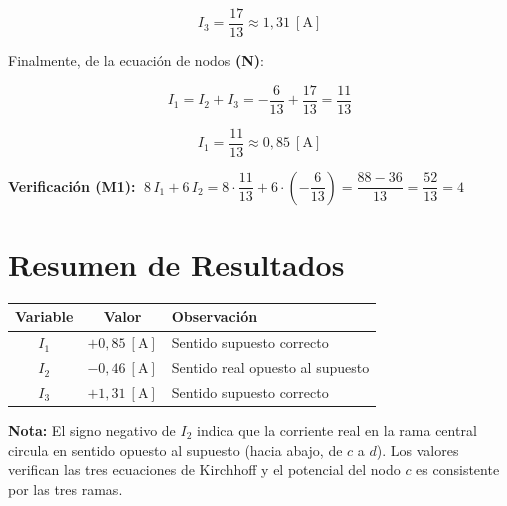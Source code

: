 \documentclass[12pt,letterpaper]{article}
\begin{document}
\[
    \boxed{I_3 = \frac{17}{13} \approx 1{,}31\ [\text{A}]}
\]

Finalmente, de la ecuaci\'on de nodos \textbf{(N)}:

\[
    I_1 = I_2 + I_3 = -\frac{6}{13} + \frac{17}{13} = \frac{11}{13}
\]

\[
    \boxed{I_1 = \frac{11}{13} \approx 0{,}85\ [\text{A}]}
\]

\noindent\textbf{Verificaci\'on (M1):}
$\;8\,I_1 + 6\,I_2 = 8\cdot\dfrac{11}{13} + 6\cdot\left(-\dfrac{6}{13}\right)
= \dfrac{88 - 36}{13} = \dfrac{52}{13} = 4$ \checkmark

\medskip

\section*{Resumen de Resultados}

\begin{center}
\begin{tabular}{|c|c|l|}
\hline
\textbf{Variable} & \textbf{Valor} & \textbf{Observaci\'on} \\
\hline
$I_1$ & $+0{,}85\ [\text{A}]$ & Sentido supuesto correcto \\
$I_2$ & $-0{,}46\ [\text{A}]$ & Sentido real opuesto al supuesto \\
$I_3$ & $+1{,}31\ [\text{A}]$ & Sentido supuesto correcto \\
\hline
\end{tabular}
\end{center}

\medskip
\noindent\textbf{Nota:} El signo negativo de $I_2$ indica que la corriente real en la rama
central circula en sentido opuesto al supuesto (hacia abajo, de $c$ a $d$). Los valores
verifican las tres ecuaciones de Kirchhoff y el potencial del nodo $c$ es consistente
por las tres ramas.
\end{document}
